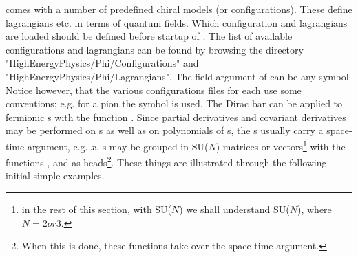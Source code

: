 \fphi comes with a number of predefined chiral models (or configurations). These define lagrangians etc. in terms of quantum fields. Which configuration and lagrangians are loaded should be defined before startup of \fc. The list of available configurations and lagrangians can be found by browsing the directory "HighEnergyPhysics/Phi/Configurations" and "HighEnergyPhysics/Phi/Lagrangians".
\beom
{}
\enom
{}
The field argument of  can be any symbol. Notice however, that the various configurations files for \fphi each use some conventions; e.g. for a pion the symbol  is used. The Dirac bar can be applied to fermionic s with the function . Since partial derivatives and covariant derivatives may be performed on s as well as on polynomials of s, the s usually carry a space-time argument, e.g. $x$. s may be grouped in SU($N$) matrices or vectors\footnote{in the rest of this section, with  SU($N$) we shall understand  SU($N$), where $N=2 or 3$.} with the functions ,  and  as heads\footnote{When this is done, these functions take over the space-time argument.}. These things are illustrated through the following initial simple examples.
\beom
